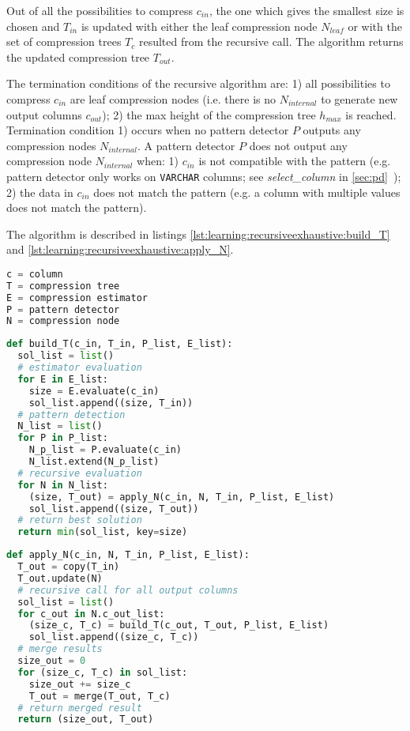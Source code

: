 Out of all the possibilities to compress \(c_{in}\), the one which gives the smallest size is chosen and \(T_{in}\) is updated with either the leaf compression node \(N_{leaf}\) or with the set of compression trees \(T_{c}\) resulted from the recursive call. The algorithm returns the updated compression tree \(T_{out}\).

The termination conditions of the recursive algorithm are: 1) all possibilities to compress \(c_{in}\) are leaf compression nodes (i.e. there is no \(N_{internal}\) to generate new output columns \(c_{out}\)); 2) the max height of the compression tree \(h_{max}\) is reached. Termination condition 1) occurs when no pattern detector \(P\) outputs any compression nodes \(N_{internal}\). A pattern detector \(P\) does not output any compression node \(N_{internal}\) when: 1) \(c_{in}\) is not compatible with the pattern (e.g.  pattern detector only works on \verb|VARCHAR| columns; see \textit{select\_column} in \ref{sec:pd}~); 2) the data in \(c_{in}\) does not match the pattern (e.g. a column with multiple values does not match the  pattern).

The algorithm is described in listings \ref{lst:learning:recursiveexhaustive:build_T} and \ref{lst:learning:recursiveexhaustive:apply_N}.

\begin{lstlisting}[language=Python,
label={lst:learning:recursiveexhaustive:naming},
caption={Naming conventions}]
c = column
T = compression tree
E = compression estimator
P = pattern detector
N = compression node
\end{lstlisting}

\begin{lstlisting}[language=Python,
label={lst:learning:recursiveexhaustive:build_T},
caption={build\_T (recursive exhaustive)}]
def build_T(c_in, T_in, P_list, E_list):
  sol_list = list()
  # estimator evaluation
  for E in E_list:
    size = E.evaluate(c_in)
    sol_list.append((size, T_in))
  # pattern detection 
  N_list = list()
  for P in P_list:
    N_p_list = P.evaluate(c_in)
    N_list.extend(N_p_list)
  # recursive evaluation
  for N in N_list:
    (size, T_out) = apply_N(c_in, N, T_in, P_list, E_list)
    sol_list.append((size, T_out))
  # return best solution
  return min(sol_list, key=size)
\end{lstlisting}

\begin{lstlisting}[language=Python,
label={lst:learning:recursiveexhaustive:apply_N},
caption={apply\_N (recursive exhaustive)}]
def apply_N(c_in, N, T_in, P_list, E_list):
  T_out = copy(T_in)
  T_out.update(N)
  # recursive call for all output columns
  sol_list = list()
  for c_out in N.c_out_list:
    (size_c, T_c) = build_T(c_out, T_out, P_list, E_list)
    sol_list.append((size_c, T_c))
  # merge results
  size_out = 0
  for (size_c, T_c) in sol_list:
    size_out += size_c
    T_out = merge(T_out, T_c)
  # return merged result
  return (size_out, T_out)
\end{lstlisting}
\bigskip

